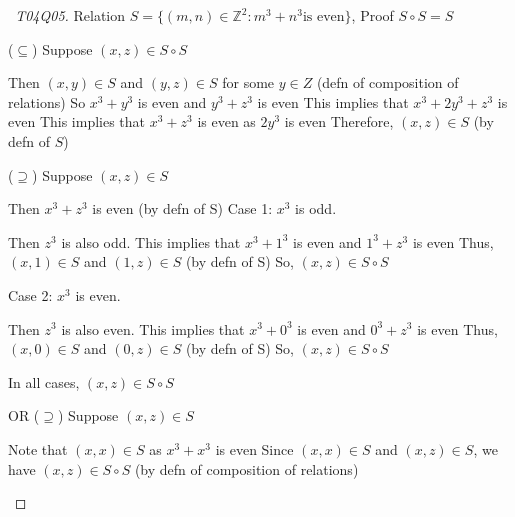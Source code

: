 \documentclass[a4paper]{article}
\theoremstyle{definition}
\begin{document}
\begin{proof}[\proofname\ T04Q05] Relation $S = \{(m,n) \in \mathbb{Z}^2: m^3 + n^3 \text{is even} \}$, Proof $S \circ S = S$
  \begin{numpf*}
    \pfln ($\subseteq$) Suppose $(x, z) \in S \circ S$
    \begin{subpf}
      \pfln Then $(x, y) \in S$ and $(y, z) \in S$ for some $y \in Z$ (defn of composition of relations)
      \pfln So $x^3 + y^3$ is even and $y^3 + z^3$ is even
      \pfln This implies that $x^3 + 2y^3 + z^3$ is even
      \pfln This implies that $x^3 + z^3$ is even as $2y^3$ is even
      \pfln Therefore, $(x, z) \in S$ (by defn of $S$)
    \end{subpf}
    \pfln ($\supseteq$) Suppose $(x,z) \in S$
    \begin{subpf}
      \pfln Then $x^3 + z^3$ is even (by defn of S)
      \pfln Case 1: $x^3$ is odd.
      \begin{subpf}
        \pfln Then $z^3$ is also odd. 
        \pfln This implies that $x^3 + 1^3$ is even and $1^3 + z^3$ is even
        \pfln Thus, $(x,1) \in S$ and $(1,z) \in S$ (by defn of S)
        \pfln So, $(x,z) \in S \circ S$
      \end{subpf}
      \pfln Case 2: $x^3$ is even.
      \begin{subpf}
        \pfln Then $z^3$ is also even. 
        \pfln This implies that $x^3 + 0^3$ is even and $0^3 + z^3$ is even
        \pfln Thus, $(x,0) \in S$ and $(0,z) \in S$ (by defn of S)
        \pfln So, $(x,z) \in S \circ S$
      \end{subpf}
      \pfln In all cases, $(x,z) \in S \circ S$
    \end{subpf}
     OR 
     \pfln ($\supseteq$) Suppose $(x,z) \in S$
     \begin{subpf}
       \pfln Note that $(x, x) \in S$ as $x^3 + x^3$ is even
       \pfln Since $(x, x) \in S$ and $(x,z) \in S$, we have $(x, z) \in S \circ S$ (by defn of composition of relations)
     \end{subpf}
  \end{numpf*}

\end{proof}
\end{document}
